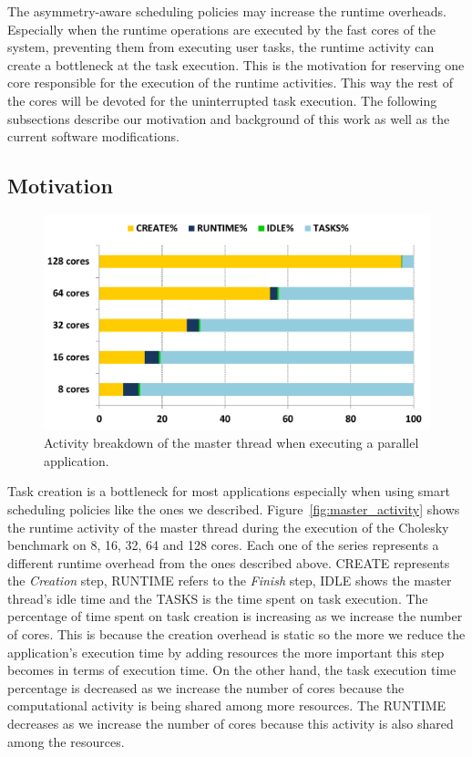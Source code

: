 The asymmetry-aware scheduling policies may increase the runtime overheads.
Especially when the runtime operations are executed by the fast cores of the system, preventing them from executing user tasks, the runtime activity can create a bottleneck at the task execution.
This is the motivation for reserving one core responsible for the execution of the runtime activities.
This way the rest of the cores will be devoted for the uninterrupted task execution.
The following subsections describe our motivation and background of this work as well as the current software modifications.
\subsection{Motivation}
\begin{figure}[t]
\includegraphics[width=0.6\columnwidth]{Figs/master_thread.pdf} 
\centering
\caption{Activity breakdown of the master thread when executing a parallel application.}
\label{master_activity}
\end{figure}
Task creation is a bottleneck for most applications especially when using smart scheduling policies like the ones we described.
Figure~\ref{fig:master_activity} shows the runtime activity of the master thread during the execution of the Cholesky benchmark on 8, 16, 32, 64 and 128 cores.
Each one of the series represents a different runtime overhead from the ones described above.
CREATE represents the \textit{Creation} step, 
RUNTIME refers to the \textit{Finish} step, IDLE shows the master thread's idle time and the TASKS is the time spent on task execution. 
The percentage of time spent on task creation is increasing as we increase the number of cores.
This is because the creation overhead is static so the more we reduce the application's execution time by adding resources the more important this step becomes in terms of execution time.
On the other hand, the task execution time percentage is decreased as we increase the number of cores because the computational activity is being shared among more resources.
The RUNTIME decreases as we increase the number of cores because this activity is also shared among the resources.

